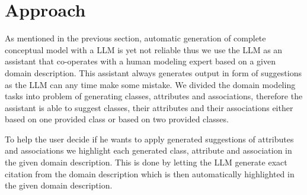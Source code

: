 \section{Approach}

As mentioned in the previous section, automatic generation of complete conceptual model with a LLM is yet not reliable thus we use the LLM as an assistant that co-operates with a human modeling expert based on a given domain description. This assistant always generates output in form of suggestions as the LLM can any time make some mistake. We divided the domain modeling tasks into problem of generating classes, attributes and associations, therefore the assistant is able to suggest classes, their attributes and their associations either based on one provided class or based on two provided classes.

To help the user decide if he wants to apply generated suggestions of attributes and associations we highlight each generated class, attribute and association in the given domain description. This is done by letting the LLM generate exact citation from the domain description which is then automatically highlighted in the given domain description.